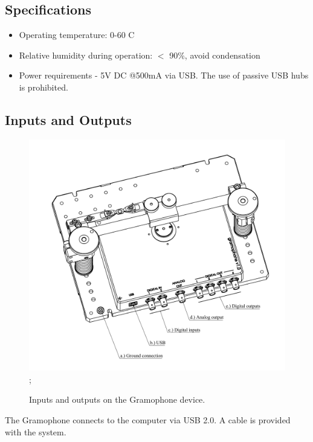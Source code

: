 \documentclass[11pt,a4paper]{article}
\begin{document}
\subsection{Specifications}
\begin{itemize}
\item Operating temperature: 0-60 \degree C
\item Relative humidity during operation:  $<$ 90\%, avoid condensation 
\item Power requirements - 5V DC @500mA via USB. The use of passive USB hubs is prohibited.
\end{itemize}

\subsection{Inputs and Outputs}
\begin{figure}[H] %
\centering
\includegraphics[clip, trim=1cm 1cm 0cm 1cm, width=1.00\textwidth]{labels_ports.PDF};
\caption{Inputs and outputs on the Gramophone device.}
\label{fig:gram_ports}
\end{figure}

The Gramophone connects to the computer via USB 2.0. A cable is provided with the system.
\end{document}
